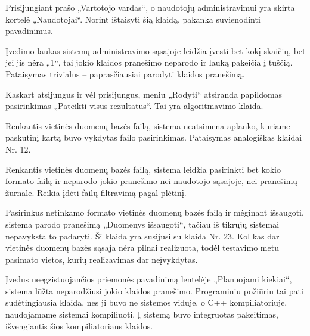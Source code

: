 {
  Prisijungiant prašo „Vartotojo vardas“, o naudotojų administravimui
  yra skirta kortelė „Naudotojai“.
}
{
  Norint ištaisyti šią klaidą, pakanka suvienodinti pavadinimus.
}

{
  Įvedimo laukas sistemų administravimo sąsajoje leidžia įvesti bet kokį
  skaičių, bet jei jis nėra „1“, tai jokio klaidos pranešimo neparodo ir lauką
  pakeičia į tuščią.
}
{
  Pataisymas trivialus – paprasčiausiai parodyti klaidos pranešimą.
}

{
  Kaskart atsijungus ir vėl prisijungus, meniu „Rodyti“ atsiranda papildomas
  pasirinkimas „Pateikti visus rezultatus“.
}
{
  Tai yra algoritmavimo klaida.
}

{
  Renkantis vietinės duomenų bazės failą, sistema neatsimena aplanko,
  kuriame paskutinį kartą buvo vykdytas failo pasirinkimas.
}
{
  Pataisymas analogiškas klaidai Nr. 12.
}

{
  Renkantis vietinės duomenų bazės failą, sistema leidžia pasirinkti
  bet kokio formato failą ir neparodo jokio pranešimo nei naudotojo sąsajoje,
  nei pranešimų žurnale.
}
{
  Reikia įdėti failų filtravimą pagal plėtinį.
}

{
  Pasirinkus netinkamo formato vietinės duomenų bazės failą ir mėginant
  išsaugoti, sistema parodo pranešimą „Duomenys išsaugoti“, tačiau iš tikrųjų
  sistemai nepavyksta to padaryti.
}
{
  Ši klaida yra susijusi su klaida Nr. 23. Kol kas dar vietinės duomenų bazės
  sąsaja nėra pilnai realizuota, todėl testavimo metu pasimato vietos, kurių
  realizavimas dar neįvykdytas.
}

{
  Įvedus neegzistuojančios priemonės pavadinimą lentelėje „Planuojami kiekiai“,
  sistema lūžta neparodžiusi jokio klaidos pranešimo.
}
{
  Programiniu požiūriu tai pati sudėtingiausia klaida, nes ji buvo ne sistemos viduje,
  o C++ kompiliatoriuje, naudojamame sistemai kompiliuoti. Į sistemą buvo integruotas
  pakeitimas, išvengiantis šios kompiliatoriaus klaidos.
}
